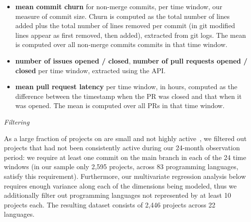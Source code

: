 \begin{itemize}

\item \textbf{mean commit churn} for non-merge commits, per time window,
our measure of commit size.
Churn is computed as the total number of lines added plus the total number
of lines removed per commit (in git modified lines appear as first removed, 
then added), extracted from git logs.
The mean is computed over all non-merge commits commits in that time window.

\item \textbf{number of issues opened / closed}, \textbf{number of pull requests
opened / closed} per time window, extracted using the \GH API.

\item \textbf{mean pull request latency} per time window, in hours, computed 
as the difference between the timestamp when the PR was closed and that 
when it was opened.
The mean is computed over all PRs in that time window.
\end{itemize}



\smallskip\noindent\emph{Filtering}

As a large fraction of projects on \GH are small and not highly 
active~\cite{gousios2014exploratory}, we filtered out projects that had not 
been consistently active during our 24-month observation period: we require
at least one commit on the main branch in each of the 24 time windows 
(in our sample only 2,595 projects, across 83 programming languages, satisfy 
this requirement).
Furthermore, our multivariate regression analysis below requires enough 
variance along each of the dimensions being modeled, thus we additionally
filter out programming languages not represented by at least 10 projects each.
The resulting dataset consists of 2,446 projects across 22 languages.



